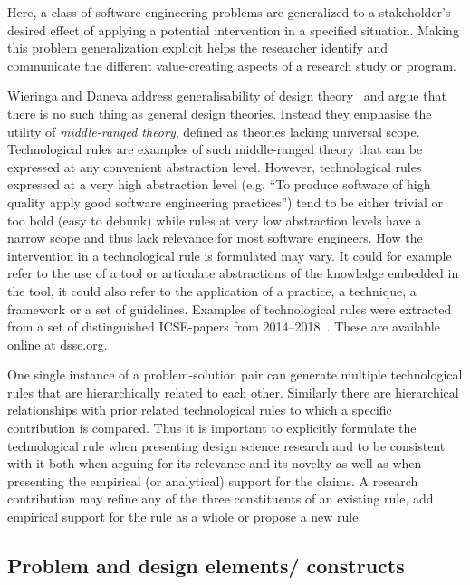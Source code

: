 \documentclass[graybox]{svmult}
\begin{document}
Here, a class of software engineering problems are generalized to a stakeholder's desired effect of applying a potential intervention in a specified situation. 
Making this problem generalization explicit helps the researcher identify and communicate the different value-creating aspects of a research study or program.



Wieringa and Daneva address generalisability of design theory~\cite{wieringa_six_2015} and argue that there is no such thing as general design theories. Instead they emphasise the utility of \emph{middle-ranged theory}, defined as theories lacking universal scope. 
Technological rules are examples of such middle-ranged theory that can be expressed at any convenient abstraction level. However, technological rules expressed at a very high abstraction level (e.g. ``To produce software of high quality apply good software engineering practices'') tend to be either trivial or too bold (easy to debunk) while rules at very low abstraction levels have a narrow scope and thus lack relevance for most software engineers. How the intervention in a technological rule is formulated may vary. It could for example refer to the use of a tool or articulate abstractions of the knowledge embedded in the tool, it could also refer to the application of a practice, a technique, a framework or a set of guidelines. Examples of technological rules were extracted from a set of distinguished ICSE-papers from 2014--2018~\cite{Engstrom19arxiv}. These are available online at dsse.org.

One single instance of a problem-solution pair can generate multiple technological rules that are hierarchically related to each other. Similarly there are hierarchical relationships with prior related technological rules to which a specific contribution is compared.
Thus it is important to explicitly formulate the technological rule when presenting design science research and to be consistent with it both when arguing for its relevance and its novelty as well as when presenting the empirical (or analytical) support for the claims.  A research contribution may refine any of the three constituents of an existing rule, add empirical support for the rule as a whole or propose a new rule.



\subsection{Problem and design elements/ constructs}
\end{document}
